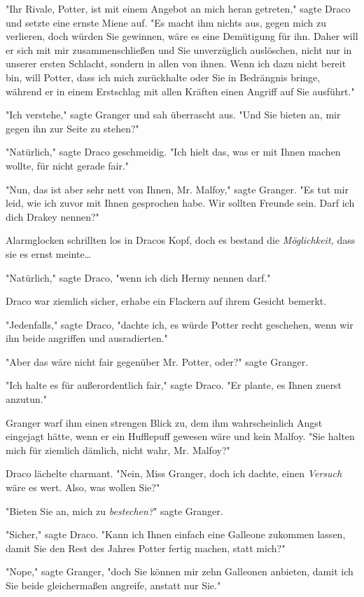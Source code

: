 {"Ihr Rivale, Potter, ist mit einem Angebot an mich heran getreten," sagte Draco und setzte eine ernste Miene auf. "Es macht ihm nichts aus, gegen mich zu verlieren, doch würden Sie gewinnen, wäre es eine Demütigung für ihn. Daher will er sich mit mir zusammenschließen und Sie unverzüglich auslöschen, nicht nur in unserer ersten Schlacht, sondern in allen von ihnen. Wenn ich dazu nicht bereit bin, will Potter, dass ich mich zurückhalte oder Sie in Bedrängnis bringe, während er in einem Erstschlag mit allen Kräften einen Angriff auf Sie ausführt."

"Ich verstehe," sagte Granger und sah überrascht aus. "Und Sie bieten an, mir gegen ihn zur Seite zu stehen?"

"Natürlich," sagte Draco geschmeidig. "Ich hielt das, was er mit Ihnen machen wollte, für nicht gerade fair."

"Nun, das ist aber sehr nett von Ihnen, Mr. Malfoy," sagte Granger. "Es tut mir leid, wie ich zuvor mit Ihnen gesprochen habe. Wir sollten Freunde sein. Darf ich dich Drakey nennen?"

Alarmglocken schrillten los in Dracos Kopf, doch es bestand die \emph{Möglichkeit,} dass sie es ernst meinte…

"Natürlich," sagte Draco, "wenn ich dich Hermy nennen darf."

Draco war ziemlich sicher, erhabe ein Flackern auf ihrem Gesicht bemerkt.

"Jedenfalls," sagte Draco, "dachte ich, es würde Potter recht geschehen, wenn wir ihn beide angriffen und ausradierten."

"Aber das wäre nicht fair gegenüber Mr. Potter, oder?" sagte Granger.

"Ich halte es für außerordentlich fair," sagte Draco. "Er plante, es Ihnen zuerst anzutun."

Granger warf ihm einen strengen Blick zu, dem ihm wahrscheinlich Angst eingejagt hätte, wenn er ein Hufflepuff gewesen wäre und kein Malfoy. "Sie halten mich für ziemlich dämlich, nicht wahr, Mr. Malfoy?"

Draco lächelte charmant. "Nein, Miss Granger, doch ich dachte, einen \emph{Versuch} wäre es wert. Also, was wollen Sie?"

"Bieten Sie an, mich zu \emph{bestechen?}" sagte Granger.

"Sicher," sagte Draco. "Kann ich Ihnen einfach eine Galleone zukommen lassen, damit Sie den Rest des Jahres Potter fertig machen, statt mich?"

"Nope," sagte Granger, "doch Sie können mir zehn Galleonen anbieten, damit ich Sie beide gleichermaßen angreife, anstatt nur Sie."

}
